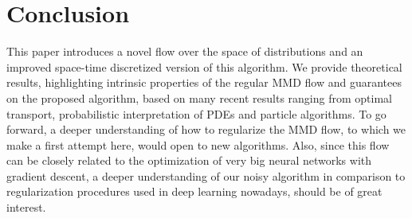 \section{Conclusion}

This paper introduces a novel flow over the space of distributions and an improved space-time discretized version of this algorithm. We provide theoretical results, highlighting intrinsic properties of the regular MMD flow and guarantees on the proposed algorithm, based on many recent results ranging from optimal transport, probabilistic interpretation of PDEs and particle algorithms. To go forward, a deeper understanding of how to regularize the MMD flow, to which we make a first attempt here, would open to new algorithms. Also, since this flow can be closely related to the optimization of very big neural networks with gradient descent, a deeper understanding of our noisy algorithm in comparison to regularization procedures used in deep learning nowadays, should be of great interest.
